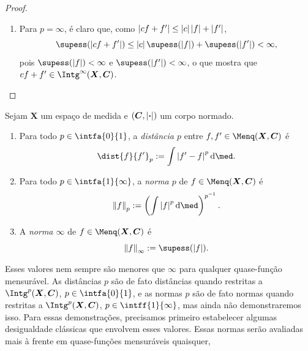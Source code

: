 \begin{proof}
\begin{enumerate}
	\item Para $p=\infty$, é claro que, como $\left\vert{cf+f'}\right\vert \leq \left\vert{c}\right\vert\left\vert{f}\right\vert + \left\vert{f'}\right\vert$,
	\begin{equation*}
	\supess(\abs{cf+f'}) \leq \abs{c}\supess(\abs{f}) + \supess(\abs{f'}) < \infty,
	\end{equation*}
pois $\supess(\abs{f}) < \infty$ e $\supess(\abs{f'}) < \infty$, o que mostra que $cf+f' \in \Intg^\infty(\bm X,\bm C)$.								\qedhere
	\end{enumerate}
\end{proof}

\begin{defi}
Sejam $\bm X$ um espaço de medida e $(\bm C, \left\vert{\bm{\cdot}}\right\vert)$ um corpo normado. 
	\begin{enumerate}
%
	\item Para todo $p \in \intfa{0}{1}$, a \emph{distância $p$} entre $f,f' \in \Menq(\bm X,\bm C)$ é
		\begin{equation*}
		\dist{f}{f'}_p := \int \abs{f'-f}^p \dd\med.
		\end{equation*}

	\item Para todo $p \in \intfa{1}{\infty}$, a \emph{norma $p$} de $f \in \Menq(\bm X,\bm C)$ é
		\begin{equation*}
		\nor{f}_p := \left( \int \abs{f}^p \dd\med \right)^{p\inv}.
		\end{equation*}

	\item A \emph{norma $\infty$} de $f \in \Menq(\bm X,\bm C)$ é
		\begin{equation*}
		\nor{f}_\infty := \supess(\abs{f}).
		\end{equation*}
	\end{enumerate}
\end{defi}

Esses valores nem sempre são menores que $\infty$ para qualquer quase-função mensurável. As distâncias $p$ são de fato distâncias quando restritas a $\Intg^p(\bm X,\bm C)$, $p \in \intfa{0}{1}$, e as normas $p$ são de fato normas quando restritas a $\Intg^p(\bm X,\bm C)$, $p \in \intff{1}{\infty}$, mas ainda não demonstraremos isso. Para essas demonstrações, precisamos primeiro estabelecer algumas desigualdade clássicas que envolvem esses valores. Essas normas serão avaliadas mais à frente em quase-funções mensuráveis quaisquer,

